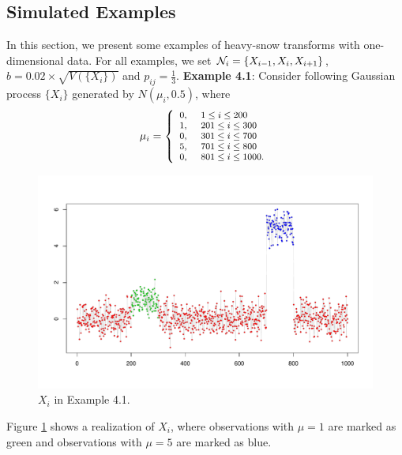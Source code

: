 \documentclass[preprint, review, 12pt]{article}
\theoremstyle{definition}
\theoremstyle{remark}
\begin{document}
\subsection{Simulated Examples}
In this section, we present some examples of heavy-snow transforms with one-dimensional data. For all examples, we set  ${\cal N}_i=\{X_{i-1},X_i,X_{i+1}\}$, $b=0.02\times \sqrt{V(\{X_i\})}$ and $p_{ij}=\frac{1}{3}$. 
\vskip 3mm
\noindent\textbf{Example 4.1}:
Consider following Gaussian process $\{X_i\}$ generated by $N(\mu_i,0.5)$, where 
\[
\footnotesize{\mu_i=\left\{
	\begin{array}{ll}
	0, &~1\le i \le 200\\
	1, &~201\le i \le 300\\
	0,&~301\le i \le 700\\
	5, &~701\le i \le 800\\
	0, &~801\le i \le 1000.\\
	\end{array}
	\right.}
\]
\begin{figure}
	\centering
	\includegraphics[width=1\textwidth]{Fig/snow_ex1_fig1.pdf}
	\caption{$X_i$ in Example 4.1.} 
	\label{snow:ex1_1}
\end{figure}
Figure \ref{snow:ex1_1} shows a realization of $X_i$, where observations with $\mu=1$ are marked as green and observations with $\mu=5$ are marked as blue.
\end{document}
